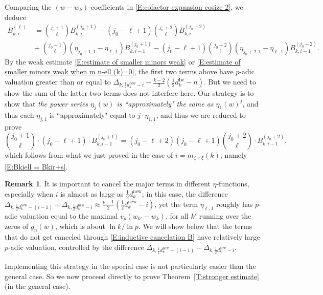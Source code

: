 \documentclass[12pt]{amsart}
\theoremstyle{definition}
\newtheorem{remark}[subsection]{Remark}
\numberwithin{equation}{subsection}
\newcommand{\new}{\mathrm{new}}
\newcommand{\Iw}{\mathrm{Iw}}
\begin{document}
Comparing the $(w-w_k)$-coefficients in \eqref{E:cofactor expansion cosize 2}, we deduce
\begin{align*}
B_{k, i}^{( \ell)}\ & =  \binom{j_0+1}\ell  B_{k, i}^{( j_0+1)} -(j_0-\ell+1) \binom{j_0+2}\ell B_{k, i}^{( j_0+2)} 
\\
& +  \; \binom{j_0+1}\ell (\eta_{j_0+1, 1}-\eta_{\ell,1} )B_{k, i-1}^{( j_0+1)} -(j_0-\ell+1) \binom{j_0+2}\ell
(\eta_{j_0+2, 1}-\eta_{\ell,1} )B_{k, i-1}^{( j_0+2)}.
\end{align*}
By the weak estimate \eqref{E:estimate of smaller minors weak} or \eqref{E:estimate of smaller minors weak when m n-ell (k)=0}, the first two terms above have $p$-adic valuation greater than or equal to $\Delta_{k, \frac 12d_k^\new - i} - \frac {k-2}2(\frac 12 d_k^\Iw-n)$. But we need to show the sum of the latter two terms does not interfere here.  Our strategy is to show that \emph{the power series $\eta_{j}(w)$ is ``approximately" the same as $\eta_1(w)^{j}$}, and thus each $\eta_{j, 1}$ is ``approximately" equal to $j\cdot  \eta_{1,1}$, and thus we are reduced to prove 
\begin{equation}
\label{E:inductive cancelation B}
\binom{j_0+1}\ell \cdot (j_0-\ell+1)\cdot B_{k, i-1}^{(j_0+1)} =(j_0-\ell+2) (j_0-\ell+1) \binom{j_0+2}\ell \cdot B_{k, i-1}^{( j_0+2)},
\end{equation}
which follows from what we just proved in the case of $i = m_{\underline \zeta \times \underline \xi}(k)$, namely \eqref{E:Bkiell = Bkir+s}.

\begin{remark}
It is important to cancel the major terms in different $\eta$-functions, especially when $i$ is almost as large as $\frac 12d_k^\new$; in this case, the difference $\Delta_{k, \frac 12d_k^\new - (i-1)} - \Delta_{k, \frac 12d_k^\new - i} \approx \frac{p-1}2 (\frac 12d_k^\new - i)$, yet the term $\eta_{\ell,1}$ roughly has $p$-adic valuation equal to the maximal $v_p(w_{k'}-w_k)$, for all $k'$ running over the zeros of $g_n(w)$, which is about $\ln k / \ln p$.  We will show below that the terms that do not get canceled through \eqref{E:inductive cancelation B} have relatively large $p$-adic valuation, controlled by the difference $\Delta_{k, \frac 12d_k^\new - (i-1)} - \Delta_{k, \frac 12d_k^\new - i}$.
\end{remark}


Implementing this strategy in the special case is not particularly easier than the general case. So we now proceed directly to prove Theorem~\ref{T:stronger estimate} (in the general case).
\end{document}
